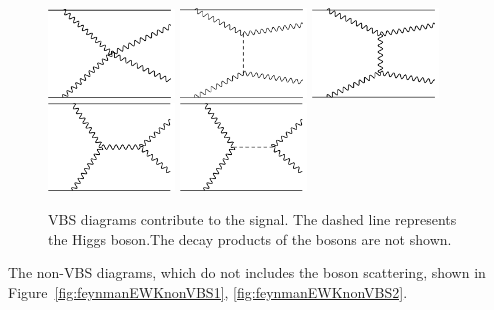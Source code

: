 \begin{figure}[H]
\begin{center}
 \includegraphics[width=0.3\textwidth,keepaspectratio]{figures/samples/feynVBS2.pdf}
 \includegraphics[width=0.3\textwidth,keepaspectratio]{figures/samples/feynVBS1.pdf}
 \includegraphics[width=0.3\textwidth,keepaspectratio]{figures/samples/feynVBS3.pdf}
 \includegraphics[width=0.3\textwidth,keepaspectratio]{figures/samples/feynVBS4.pdf}
 \includegraphics[width=0.3\textwidth,keepaspectratio]{figures/samples/feynVBS5.pdf}
\caption[f]{
VBS diagrams contribute to the signal.  
The dashed line represents the Higgs boson.The decay products of the bosons are not shown.
}
\label{fig:feynmanVBS}
\end{center}
\end{figure}

The non-VBS diagrams, which do not includes the boson scattering, shown in Figure~\ref{fig:feynmanEWKnonVBS1}, \ref{fig:feynmanEWKnonVBS2}. 

